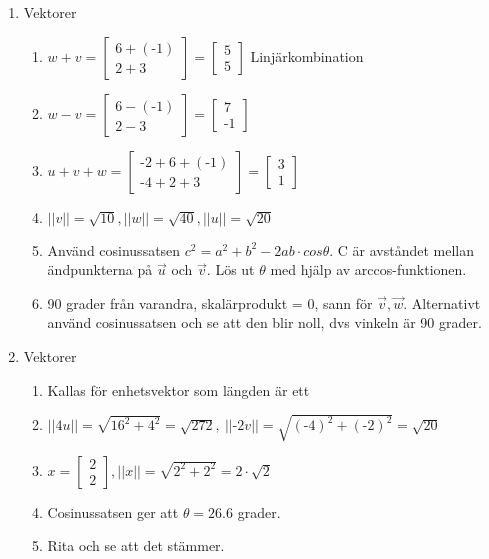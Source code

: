 \documentclass[a4paper]{article}
\begin{document}
\begin{enumerate}
\item Vektorer
\begin{enumerate}
\item $w+v = \begin{bmatrix}6+(\text{-}1)\\ 2+3\end{bmatrix} =\begin{bmatrix} 5\\ 5 \end{bmatrix}$ Linjärkombination
\item $w-v = \begin{bmatrix}6-(\text{-}1)\\ 2-3\end{bmatrix} = \begin{bmatrix} 7\\ \text{-}1\end{bmatrix}$
\item $u+v+w= \begin{bmatrix}\text{-}2+6+(\text{-}1)\\ \text{-}4+2+3\end{bmatrix} = \begin{bmatrix}3\\ 1\end{bmatrix}$
\item $||v||=\sqrt{10}, ||w||=\sqrt{40}, ||u||=\sqrt{20}$
\item Använd cosinussatsen $c^2=a^2+b^2-2ab\cdot cos \theta$. C är avståndet mellan ändpunkterna på $\vec{u}$ och $\vec{v}$. Lös ut $\theta$ med hjälp av arccos-funktionen. 
\item 90 grader från varandra, skalärprodukt = 0, sann för $\vec{v}, \vec{w}$. Alternativt använd cosinussatsen och se att den blir noll, dvs vinkeln är 90 grader. 
\end{enumerate}

\item Vektorer
\begin{enumerate}
\item Kallas för enhetsvektor som längden är ett
\item $||4u||=\sqrt{16^{2}+4^{2}}=\sqrt{272},\ ||\text{-}2v||=\sqrt{(\text{-}4)^{2}+(\text{-}2)^{2}}=\sqrt{20}$ 
\item $x = \begin{bmatrix} 2\\ 2 \end{bmatrix}, ||x||= \sqrt{2^{2}+2^{2}}=2\cdot\sqrt{2}$
\item Cosinussatsen ger att $\theta = 26.6$ grader.
\item Rita och se att det stämmer.
\end{enumerate}


\end{enumerate}
\end{document}
